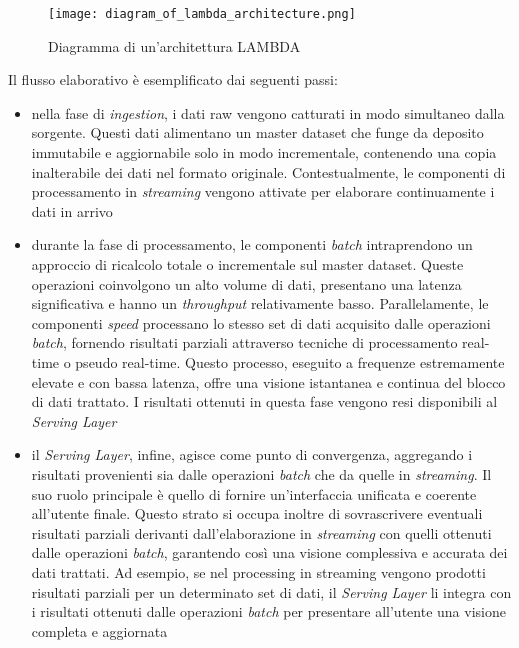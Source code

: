\begin{figure}[H]
    \centering
    \texttt{[image: diagram\_of\_lambda\_architecture.png]}
    \caption[Architettura LAMBDA]{Diagramma di un'architettura LAMBDA \cite{lambdaArchitecture}}
\end{figure}

Il flusso elaborativo è esemplificato dai seguenti passi:
\begin{itemize}
    \item nella fase di \textit{ingestion}, i dati raw vengono catturati in modo simultaneo dalla sorgente. Questi dati alimentano un master dataset che funge da deposito immutabile e aggiornabile solo in modo incrementale, contenendo una copia inalterabile dei dati nel formato originale. Contestualmente, le componenti di processamento in \textit{streaming} vengono attivate per elaborare continuamente i dati in arrivo
    \item durante la fase di processamento, le componenti \textit{batch} intraprendono un approccio di ricalcolo totale o incrementale sul master dataset. Queste operazioni coinvolgono un alto volume di dati, presentano una latenza significativa e hanno un \textit{throughput} relativamente basso. Parallelamente, le componenti \textit{speed} processano lo stesso set di dati acquisito dalle operazioni \textit{batch}, fornendo risultati parziali attraverso tecniche di processamento real-time o pseudo real-time. Questo processo, eseguito a frequenze estremamente elevate e con bassa latenza, offre una visione istantanea e continua del blocco di dati trattato. I risultati ottenuti in questa fase vengono resi disponibili al \textit{Serving Layer}
    \item il \textit{Serving Layer}, infine, agisce come punto di convergenza, aggregando i risultati provenienti sia dalle operazioni \textit{batch} che da quelle in \textit{streaming}. Il suo ruolo principale è quello di fornire un'interfaccia unificata e coerente all'utente finale. Questo strato si occupa inoltre di sovrascrivere eventuali risultati parziali derivanti dall'elaborazione in \textit{streaming} con quelli ottenuti dalle operazioni \textit{batch}, garantendo così una visione complessiva e accurata dei dati trattati. Ad esempio, se nel processing in streaming vengono prodotti risultati parziali per un determinato set di dati, il \textit{Serving Layer} li integra con i risultati ottenuti dalle operazioni \textit{batch} per presentare all'utente una visione completa e aggiornata
\end{itemize}

